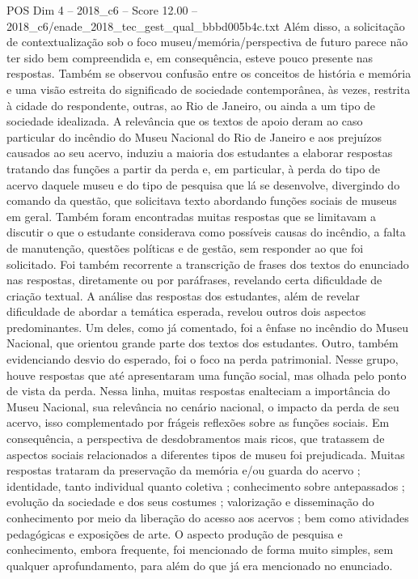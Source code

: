 \begin{textsample}{POS Dim 4 – 2018\_c6 – Score 12.00 – 2018\_c6/enade\_2018\_tec\_gest\_qual\_bbbd005b4c.txt}
Além disso, a solicitação de contextualização sob o foco museu/memória/perspectiva de futuro parece não ter sido bem compreendida e, em consequência, esteve pouco presente nas respostas.
Também se observou confusão entre os conceitos de história e memória e uma visão estreita do significado de sociedade contemporânea, às vezes, restrita à cidade do respondente, outras, ao Rio de Janeiro, ou ainda a um tipo de sociedade idealizada.
A relevância que os textos de apoio deram ao caso particular do incêndio do Museu Nacional do Rio de Janeiro e aos prejuízos causados ao seu acervo, induziu a maioria dos estudantes a elaborar respostas tratando das funções a partir da perda e, em particular, à perda do tipo de acervo daquele museu e do tipo de pesquisa que lá se desenvolve, divergindo do comando da questão, que solicitava texto abordando funções sociais de museus em geral.
Também foram encontradas muitas respostas que se limitavam a discutir o que o estudante considerava como possíveis causas do incêndio, a falta de manutenção, questões políticas e de gestão, sem responder ao que foi solicitado.
Foi também recorrente a transcrição de frases dos textos do enunciado nas respostas, diretamente ou por paráfrases, revelando certa dificuldade de criação textual.
A análise das respostas dos estudantes, além de revelar dificuldade de abordar a temática esperada, revelou outros dois aspectos predominantes.
Um deles, como já comentado, foi a ênfase no incêndio do Museu Nacional, que orientou grande parte dos textos dos estudantes.
Outro, também evidenciando desvio do esperado, foi o foco na perda patrimonial.
Nesse grupo, houve respostas que até apresentaram uma função social, mas olhada pelo ponto de vista da perda.
Nessa linha, muitas respostas enalteciam a importância do Museu Nacional, sua relevância no cenário nacional, o impacto da perda de seu acervo, isso complementado por frágeis reflexões sobre as funções sociais.
Em consequência, a perspectiva de desdobramentos mais ricos, que tratassem de aspectos sociais relacionados a diferentes tipos de museu foi prejudicada.
Muitas respostas trataram da preservação da memória e/ou guarda do acervo ; identidade, tanto individual quanto coletiva ; conhecimento sobre antepassados ; evolução da sociedade e dos seus costumes ; valorização e disseminação do conhecimento por meio da liberação do acesso aos acervos ; bem como atividades pedagógicas e exposições de arte.
O aspecto produção de pesquisa e conhecimento, embora frequente, foi mencionado de forma muito simples, sem qualquer aprofundamento, para além do que já era mencionado no enunciado.

\end{textsample}
